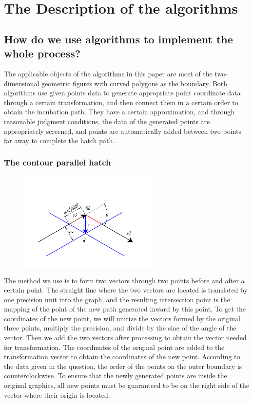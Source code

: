 \documentclass{apmcmthesis}
\begin{document}
\section{The Description of the algorithms}


\subsection{How do we use algorithms to implement the whole process?}

The applicable objects of the algorithms in this paper are most of the two-dimensional geometric figures with curved polygons as the boundary. Both algorithms use given points data to generate appropriate point coordinate data through a certain transformation, and then connect them in a certain order to obtain the incubation path. They have a certain approximation, and through reasonable judgment conditions, the data of the generated points are appropriately screened, and points are automatically added between two points far away to complete the hatch path.



\subsubsection{The contour parallel hatch}

\begin{figure}[!ht]
  \centering
  \includegraphics[width=7cm]{v} 
  \caption{}
\end{figure}


The method we use is to form two vectors through two points before and after a certain point. The straight line where the two vectors are located is translated by one precision unit into the graph, and the resulting intersection point is the mapping of the point of the new path generated inward by this point. To get the coordinates of the new point, we will unitize the vectors formed by the original three points, multiply the precision, and divide by the sine of the angle of the vector. Then we add the two vectors after processing to obtain the vector needed for transformation. The coordinates of the original point are added to the transformation vector to obtain the coordinates of the new point. According to the data given in the question, the order of the points on the outer boundary is counterclockwise. To ensure that the newly generated points are inside the original graphics, all new points must be guaranteed to be on the right side of the vector where their origin is located.
\end{document}
